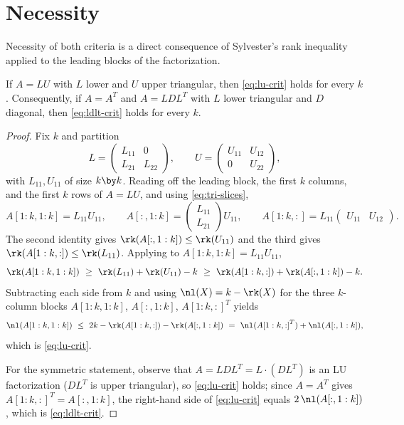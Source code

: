 \section{Necessity}\label{sec:necessity}

Necessity of both criteria is a direct consequence of Sylvester's rank
inequality applied to the leading blocks of the factorization.

\begin{proposition}[necessity]\label{prop:necessity}
  If $A = LU$ with $L$ lower and $U$ upper triangular, then
  \cref{eq:lu-crit} holds for every $k$.  Consequently, if $A = A^T$ and
  $A = LDL^T$ with $L$ lower triangular and $D$ diagonal, then
  \cref{eq:ldlt-crit} holds for every $k$.
\end{proposition}

\begin{proof}
  Fix $k$ and partition
  \[
    L =
    \begin{pmatrix}
      L_{11} & 0\\
      L_{21} & L_{22}
    \end{pmatrix},
    \qquad
    U =
    \begin{pmatrix}
      U_{11} & U_{12}\\
      0      & U_{22}
    \end{pmatrix},
  \]
  with $L_{11}, U_{11}$ of size $k \by k$.  Reading off the leading block,
  the first $k$ columns, and the first $k$ rows of $A = LU$, and using
  \cref{eq:tri-slices},
  \[
    A[1:k,1:k] = L_{11} U_{11},
    \qquad
    A[:,1:k] =
    \begin{pmatrix}
      L_{11}\\
      L_{21}
    \end{pmatrix} U_{11},
    \qquad
    A[1:k,:] = L_{11}
    \begin{pmatrix}
      U_{11} & U_{12}
    \end{pmatrix}.
  \]
  The second identity gives $\rk(A[:,1:k]) \le \rk(U_{11})$ and the third
  gives $\rk(A[1:k,:]) \le \rk(L_{11})$.  Applying  to
  $A[1:k,1:k] = L_{11} U_{11}$,
  \[
    \rk(A[1:k,1:k])
    \ \ge\ \rk(L_{11}) + \rk(U_{11}) - k
    \ \ge\ \rk(A[1:k,:]) + \rk(A[:,1:k]) - k .
  \]
  Subtracting each side from $k$ and using $\nl(X) = k - \rk(X)$ for the
  three $k$-column blocks $A[1:k,1:k]$, $A[:,1:k]$, ${A[1:k,:]}^T$ yields
  \[
    \nl(A[1:k,1:k])
    \ \le\ 2k - \rk(A[1:k,:]) - \rk(A[:,1:k])
    \ =\ \nl({A[1:k,:]}^T) + \nl(A[:,1:k]),
  \]
  which is \cref{eq:lu-crit}.

  For the symmetric statement, observe that $A = LDL^T = L \cdot (DL^T)$ is
  an LU factorization ($DL^T$ is upper triangular), so \cref{eq:lu-crit}
  holds; since $A = A^T$ gives ${A[1:k,:]}^T = A[:,1:k]$, the right-hand
  side of \cref{eq:lu-crit} equals $2\,\nl(A[:,1:k])$, which is
  \cref{eq:ldlt-crit}.
\end{proof}
